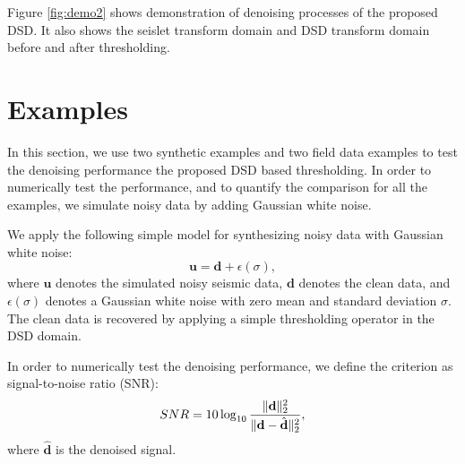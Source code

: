  Figure \ref{fig:demo2} shows  demonstration of denoising processes of the proposed DSD. It also shows the seislet transform domain and DSD transform domain before and after thresholding. 




\section{Examples}
In this section, we use two synthetic examples and two field data examples to test the denoising performance  
the proposed DSD based thresholding. In order to numerically test the performance, and to quantify the 
comparison for all the examples, we simulate  noisy data by adding Gaussian white noise.


We apply the following simple model for synthesizing noisy data with Gaussian white noise:
\begin{equation}
\label{eq:eq9}
\mathbf{u} = \mathbf{d} + \epsilon(\sigma),
\end{equation}
where $\mathbf{u}$ denotes the simulated noisy seismic data, $\mathbf{d}$ denotes the clean data, and $\epsilon(\sigma)$ denotes a Gaussian white noise with zero mean and standard deviation $\sigma$. The clean data is recovered by applying a simple thresholding operator in the DSD domain.

In order to numerically test the denoising performance, we define the criterion  as signal-to-noise ratio (SNR):
\begin{equation}
\label{eq:diff}
SNR=10\log_{10}\frac{\Arrowvert \mathbf{d} \Arrowvert_2^2}{\Arrowvert \mathbf{d}-\hat{\mathbf{d}}\Arrowvert_2^2},
\end{equation}
where %
$\hat{\mathbf{d}}$ is the denoised signal.

